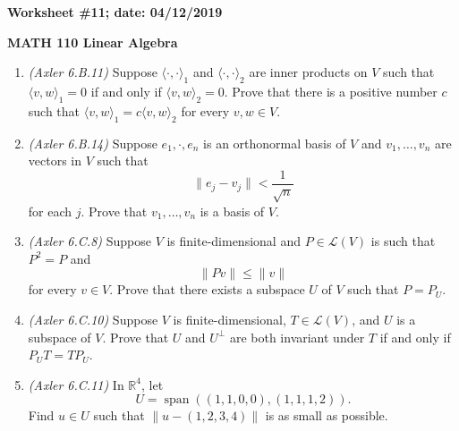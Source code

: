 \documentclass{article}
\newcommand{\RR}{\mathbb{R}}
\newcommand{\cL}{\mathcal{L}}
\DeclareMathOperator*{\opspan}{span}
\begin{document}
{\bf Worksheet \#11; date: 04/12/2019}

{\bf MATH 110 Linear Algebra}

\begin{enumerate}
\item {\em (Axler 6.B.11)} Suppose $\langle \cdot, \cdot \rangle_1$ and $\langle \cdot, \cdot \rangle_2$ are inner products on $V$ such that $\langle v, w \rangle_1 = 0$ if and only if $\langle v, w \rangle_2 = 0$. Prove that there is a positive number $c$ such that $\langle v, w \rangle_1 = c \langle v, w \rangle_2$ for every $v, w \in V$.

\item {\em (Axler 6.B.14)} Suppose $e_1, \cdot, e_n$ is an orthonormal basis of $V$ and $v_1, \ldots, v_n$ are vectors in $V$ such that
\[
	\|e_j - v_j\| < \frac{1}{\sqrt{n}}
\]
for each $j$. Prove that $v_1, \ldots, v_n$ is a basis of $V$.

\item {\em (Axler 6.C.8)} Suppose $V$ is finite-dimensional and $P \in \cL(V)$ is such that $P^2 = P$ and
\[
	\|Pv\| \le \|v\|
\]
for every $v \in V$. Prove that there exists a subspace $U$ of $V$ such that $P = P_U$.

\item {\em (Axler 6.C.10)} Suppose $V$ is finite-dimensional, $T \in \cL(V)$, and $U$ is a subspace of $V$. Prove that $U$ and $U^\perp$ are both invariant under $T$ if and only if $P_U T = TP_U$.

\item {\em (Axler 6.C.11)} In $\RR^4$, let
\[
	U = \opspan\left((1, 1, 0, 0), (1, 1, 1, 2)\right).
\]
Find $u \in U$ such that $\|u - (1, 2, 3, 4)\|$  is as small as possible.
\end{enumerate}
\end{document}

